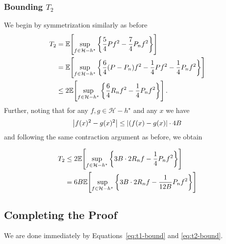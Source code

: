 \documentclass[main.tex]{subfiles}
\begin{document}
\subsubsection{Bounding \texorpdfstring{$T_{2}$}{T2}}
We begin by symmetrization similarly as before
\begin{align*}
  T_{2}
  &= \mathbb{E}\!\left[{
      \sup_{f \in \mathcal{H} - h^{\star}}
      \left\{
      \frac{5}{4}Pf^{2} - \frac{7}{4}P_{n}f^{2}
      \right\}
     }\right] \\
  &= \mathbb{E}\!\left[{
      \sup_{f \in \mathcal{H} - h^{\star}}
      \left\{
      \frac{6}{4}(P - P_{n})f^{2} - \frac{1}{4}Pf^{2} - \frac{1}{4}P_{n}f^{2}
      \right\}
     }\right] \\
  &\leq  2\mathbb{E}\!\left[{
      \sup_{f \in \mathcal{H} - h^{\star}}
      \left\{
      \frac{6}{4}R_{n}f^{2} - \frac{1}{4}P_{n}f^{2}
      \right\}
     }\right].
\end{align*}
Further, noting that for any $f,g \in \mathcal{H} - h^{\star}$
and any $x$ we have
$$
  \left\lvert f(x)^{2} - g(x)^{2} \right\rvert
  \leq \left\lvert (f(x) - g(x) \right\rvert \cdot 4B
$$
and following the same contraction argument as before, we obtain

\begin{align}
  T_{2}
  &\leq 2
  \mathbb{E}\!\left[{\sup_{f \in \mathcal{H} - h^{\star}}
      \left\{
        3B \cdot 2R_{n}f - \frac{1}{4}P_{n}f^{2}
      \right\}
  }\right] \notag \\
  &= 6B
  \mathbb{E}\!\left[{\sup_{f \in \mathcal{H} - h^{\star}}
      \left\{
        3B \cdot 2R_{n}f - \frac{1}{12B}P_{n}f^{2}
      \right\}
  }\right]
  \label{eq:t2-bound}
\end{align}
\subsection{Completing the Proof}
We are done immediately by Equations~\eqref{eq:t1-bound} and
\eqref{eq:t2-bound}.
\end{document}
